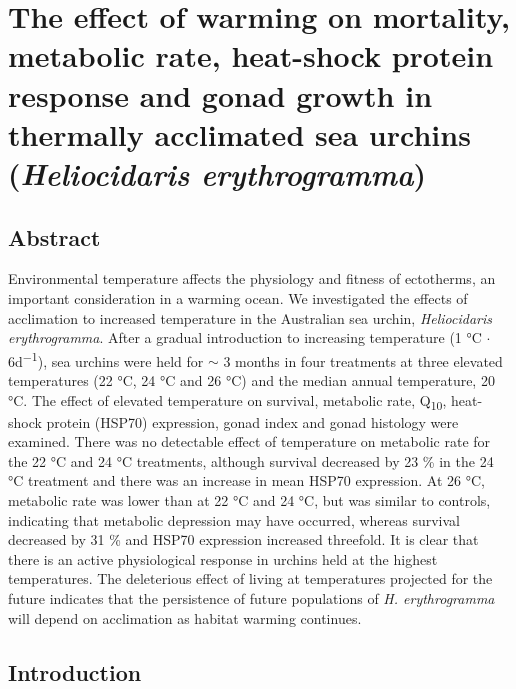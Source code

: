 \documentclass[a4paper,10pt, oneside]{memoir}
\begin{document}
\hypertarget{warming}{%
\chapter{\texorpdfstring{The effect of warming on mortality, metabolic rate, heat-shock protein response and gonad growth in thermally acclimated sea urchins (\emph{Heliocidaris erythrogramma})}{The effect of warming on mortality, metabolic rate, heat-shock protein response and gonad growth in thermally acclimated sea urchins (Heliocidaris erythrogramma)}}\label{warming}}


\hypertarget{abstract-1}{%
\section*{Abstract}\label{abstract-1}}

Environmental temperature affects the physiology and fitness of ectotherms, an important consideration in a warming ocean.
We investigated the effects of acclimation to increased temperature in the Australian sea urchin, \emph{Heliocidaris erythrogramma}.
After a gradual introduction to increasing temperature (1 °C \(\cdot\) 6d\textsuperscript{−1}), sea urchins were held for \(\sim\) 3 months in four treatments at three elevated temperatures (22 °C, 24 °C and 26 °C) and the median annual temperature, 20 °C. The effect of elevated temperature on survival, metabolic rate, Q\textsubscript{10}, heat-shock protein (HSP70) expression, gonad index and gonad histology were examined.
There was no detectable effect of temperature on metabolic rate for the 22 °C and 24 °C treatments, although survival decreased by 23 \% in the 24 °C treatment and there was an increase in mean HSP70 expression.
At 26 °C, metabolic rate was lower than at 22 °C and 24 °C, but was similar to controls, indicating that metabolic depression may have occurred, whereas survival decreased by 31 \% and HSP70 expression increased threefold.
It is clear that there is an active physiological response in urchins held at the highest temperatures.
The deleterious effect of living at temperatures projected for the future indicates that the persistence of future populations of \emph{H. erythrogramma} will depend on acclimation as habitat warming continues.

\hypertarget{introduction}{%
\section{Introduction}\label{introduction}}
\end{document}
